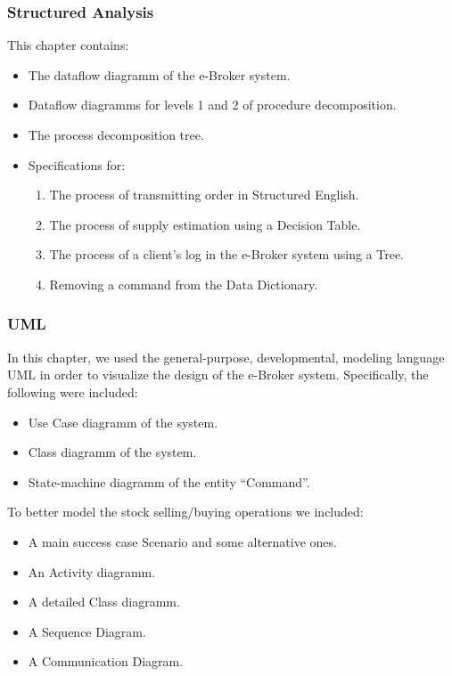 \documentclass{article}
\begin{document}
\subsubsection{Structured Analysis}
This chapter contains:
\begin{itemize}
\item The dataflow diagramm of the e-Broker system.
\item Dataflow diagramms for levels 1 and 2 of procedure decomposition.
\item The process decomposition tree.
\item Specifications for:
\begin{enumerate}
\item The process of transmitting order in Structured English.
\item The process of supply estimation using a Decision Table.
\item The process of a client's log in the e-Broker system using a Tree.
\item Removing a command from the Data Dictionary.  
\end{enumerate}
\end{itemize} 

\subsubsection{UML}
In this chapter, we used the general-purpose, developmental, modeling language UML in order to visualize the design of the e-Broker system. Specifically, the following were included:

\begin{itemize}[{label=\tiny$\triangleright$}]
\item Use Case diagramm of the system.
\item Class diagramm of the system.
\item State-machine diagramm of the entity ``Command''.
\end{itemize}

To better model the stock selling/buying operations we included:

\begin{itemize}[{label=\tiny$\triangleright$}]
\item A main success case Scenario and some alternative ones.
\item An Activity diagramm.
\item A detailed Class diagramm.
\item A Sequence Diagram.
\item A Communication Diagram.
\end{itemize}
\end{document}
